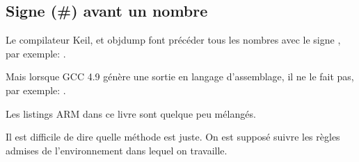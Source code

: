 ﻿

\subsection{Signe (\#) avant un nombre}

Le compilateur Keil, \IDA et objdump font précéder tous les nombres avec le signe
\q{\#}, par exemple:
.

Mais lorsque GCC 4.9 génère une sortie en langage d'assemblage, il ne le fait pas,
par exemple:
.

Les listings ARM dans ce livre sont quelque peu mélangés.

Il est difficile de dire quelle méthode est juste.
On est supposé suivre les règles admises de l'environnement dans lequel on travaille.





